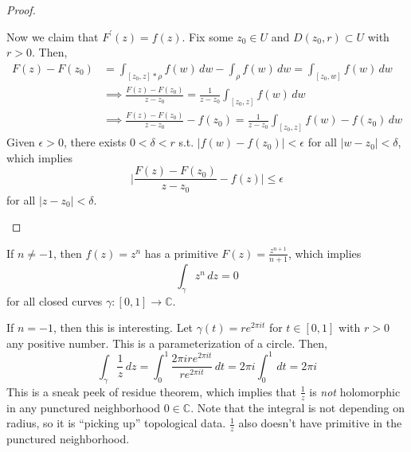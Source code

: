 \begin{proof}
\begin{enumerate}
				Now we claim that $F^\prime (z) = f(z)$. Fix some $z_0 \in U$ and $D(z_0, r) \subset U$ with $r > 0$. Then, 
				\begin{align}
					F(z) - F(z_0) & = \int_{[z_0, z] \ast \rho} f(w) \,dw - \int_\rho f(w) \,dw = \int_{[z_0, w]} f(w) \,dw \\ 
												& \implies \frac{F(z) - F(z_0)}{z - z_0} = \frac{1}{z - z_0} \int_{[z_0, z]} f(w) \,dw  \\ 
												& \implies \frac{F(z) - F(z_0)}{z - z_0} - f(z_0) = \frac{1}{z - z_0} \int_{[z_0, z]} f(w) - f(z_0) \,dw
				\end{align}
				Given $\epsilon > 0$, there exists $0 < \delta < r$ s.t. $|f(w) - f(z_0)| < \epsilon$ for all $|w - z_0| < \delta$, which implies 
				\begin{equation}
					\bigg| \frac{F(z) - F(z_0)}{z - z_0} - f(z) \bigg| \leq \epsilon
				\end{equation}
				for all $|z - z_0| < \delta$. 
		\end{enumerate}
	\end{proof}

	\begin{example}
	  \label{ex:primitive-of-zn-for-nneq1}
		If $n \neq -1$, then $f(z) = z^n$ has a primitive $F(z) = \frac{z^{n+1}}{n+1}$, which implies 
		\begin{equation}
		  \int_\gamma z^n \,dz = 0
		\end{equation}
		for all closed curves $\gamma: [0, 1] \to \mathbb{C}$. 
	\end{example}

	\begin{example}
	  \label{ex:the-integral-of-1z-around-a-circle}
		If $n = -1$, then this is interesting. Let $\gamma(t) = r e^{2 \pi i t}$ for $t \in [0, 1]$ with $r > 0$ any positive number. This is a parameterization of a circle. Then, 
		\begin{equation}
			\int_\gamma \frac{1}{z} \,dz = \int_0^1 \frac{2 \pi i r e^{2 \pi i t}}{r e^{2 \pi i t}} \,dt = 2 \pi i \int_0^1 \,dt = 2 \pi i
		\end{equation} 
		This is a sneak peek of residue theorem, which implies that $\frac{1}{z}$ is \textit{not} holomorphic in any punctured neighborhood $0 \in \mathbb{C}$. Note that the integral is not depending on radius, so it is ``picking up'' topological data. $\frac{1}{z}$ also doesn't have primitive in the punctured neighborhood. 
	\end{example}

